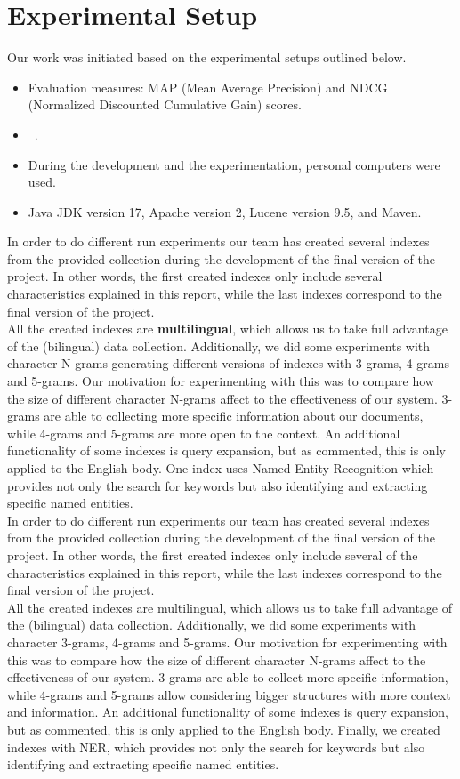 \section{Experimental Setup}\label{sec:setup}

Our work was initiated based on the experimental setups outlined below.
\begin{itemize}
	\item Evaluation measures: MAP (Mean Average Precision) and NDCG (Normalized Discounted Cumulative Gain) scores.
	\item~\citep[Repository]{jihuming}.
	\item During the development and the experimentation, personal computers were used.
	\item Java JDK version 17, Apache version 2, Lucene version 9.5, and Maven.
\end{itemize}
In order to do different run experiments our team has created several indexes from the provided collection during the development of the final version of the project. In other words, the first created indexes only include several characteristics explained in this report, while the last indexes correspond to the final version of the project.\\
All the created indexes are \textbf{multilingual}, which allows us to take full advantage of the (bilingual) data collection. Additionally, we did some experiments with character N-grams generating different versions of indexes with 3-grams, 4-grams and 5-grams. Our motivation for experimenting with this was to compare how the size of different character N-grams affect to the effectiveness of our system. 3-grams are able to collecting more specific information about our documents, while 4-grams and 5-grams are more open to the context. An additional functionality of some indexes is query expansion, but as commented, this is only applied to the English body. One index uses Named Entity Recognition which provides not only the search for keywords but also identifying and extracting specific named entities.\\
In order to do different run experiments our team has created several indexes from the provided collection during the
development of the final version of the project.
In other words, the first created indexes only include several of the characteristics explained in this report, while
the last indexes correspond to the final version of the project.\\
All the created indexes are multilingual, which allows us to take full advantage of the (bilingual) data collection.
Additionally, we did some experiments with character 3-grams, 4-grams and 5-grams.
Our motivation for experimenting with this was to compare how the size of different character N-grams affect to the
effectiveness of our system. 3-grams are able to collect more specific information, while 4-grams and 5-grams allow considering bigger structures with more context and information. An additional functionality of some indexes is query expansion, but as commented, this is only applied to the English body. Finally, we created indexes with NER, which provides not only the search for keywords but also identifying and extracting specific named entities.\\

